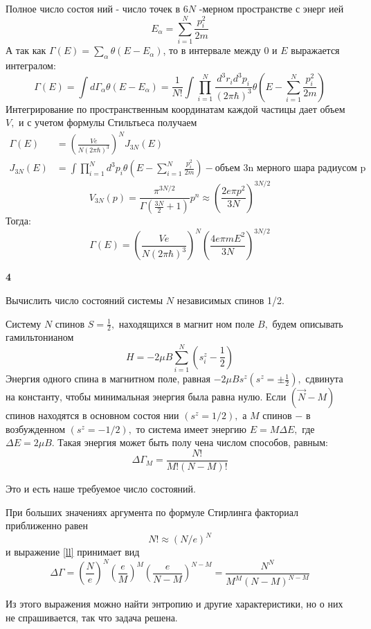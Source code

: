 \documentclass[a4paper,12pt]{article} %
\begin{document}
\begin{task}
Полное число состоя ний - число точек в $6 N$ -мерном пространстве с энерг ией
$$
E_{\alpha}=\sum_{i=1}^{N} \frac{p_{i}^{2}}{2 m}
$$
А так как $ \Gamma(E)=\sum_{\alpha} \theta\left(E-E_{\alpha}\right)$, то в интервале между 0 и $E$ выражается интегралом:
$$
\Gamma(E)=\int d \Gamma_{\alpha} \theta\left(E-E_{\alpha}\right)=\frac{1}{N !} \int \prod_{i=1}^{N} \frac{d^{3} r_{i} d^{3} p_{i}}{(2 \pi \hbar)^{3}} \theta\left(E-\sum_{i=1}^{N} \frac{p_{i}^{2}}{2 m}\right)
$$
Интегрирование по пространственным координатам каждой частицы дает объем $V,$ и с учетом формулы Стильтьеса получаем
$$
\begin{aligned}
\Gamma(E) &=\left(\frac{V e}{N(2 \pi \hbar)^{3}}\right)^{N} J_{3 N}(E) \\
J_{3 N}(E) &=\int \prod_{i=1}^{N} d^{3} p_{i} \theta\left(E-\sum_{i=1}^{N} \frac{p_{i}^{2}}{2 m}\right) - \text{объем 3n мерного шара радиусом p}
\end{aligned}
$$
%
\[ V_{3N}(p)= \frac{\pi^{3N/2}}{\Gamma (\frac{3N}{2}+1)}p^n \approx \left( \frac{2 e \pi p^2}{3N}\right)^{3N/2}  \]
%
Тогда:
\[ \Gamma(E)= \left( \frac{Ve}{N (2\pi\hbar)^3}\right)^N \left(\frac{4e\pi m E^2}{3N}\right)^{3N/2}\]



\end{task}


\begin{task}\textbf{4}

Вычислить число состояний системы $ N $ независимых спинов 1/2.


Систему $N$ спинов $S=\frac{1}{2},$ находящихся в магнит ном поле $B,$ будем описывать гамильтонианом
$$
H=-2 \mu B \sum_{i=1}^{N}\left(s_{i}^{z}-\frac{1}{2}\right)
$$
Энергия одного спина в магнитном поле, равная $-2 \mu B s^{z}\left(s^{z}=\pm \frac{1}{2}\right),$ сдвинута на константу, чтобы минимальная энергия была равна нулю. 
Если $(\vec{N}-M)$ спинов находятся в основном состоя нии $\left(s^{z}=1 / 2\right),$ а $M$ спинов $-$ в возбужденном $(s^{z}=-1 / 2),$ то система имеет энергию $E=M \Delta E,$ где $\Delta E=2 \mu B .$ 
Такая энергия может быть полу чена числом способов, равным:
\begin{equation}\label{ll}
\Delta \Gamma_{M}=\frac{N !}{M !(N-M) !}
\end{equation}

Это и есть наше требуемое число состояний.

При больших значениях аргумента по формуле Стирлинга факториал приближенно равен
$$
N ! \approx(N / e)^{N}
$$
и выражение \ref{ll} принимает вид
$$
\Delta \Gamma=\left(\frac{N}{e}\right)^{N}\left(\frac{e}{M}\right)^{M}\left(\frac{e}{N-M}\right)^{N-M}=\frac{N^{N}}{M^{M}(N-M)^{N-M}}
$$

Из этого выражения можно найти энтропию и другие характеристики, но о них не спрашивается, так что задача решена.


\end{task}
\end{document}
